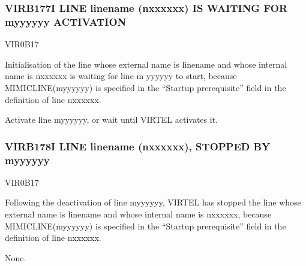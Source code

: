 \documentclass[letterpaper,10pt,english]{sphinxmanual}
\begin{document}
\subsubsection{VIRB177I LINE linename (n\sphinxhyphen{}xxxxxx) IS WAITING FOR m\sphinxhyphen{}yyyyyy ACTIVATION}
\label{\detokenize{messages:virb177i-line-linename-n-xxxxxx-is-waiting-for-m-yyyyyy-activation}}\begin{description}
\sphinxAtStartPar
VIR0B17

\sphinxAtStartPar
Initialisation of the line whose external name is linename and whose internal name is n\sphinxhyphen{}xxxxxx is waiting for line m\sphinxhyphen{} yyyyyy to start, because MIMIC\sphinxhyphen{}LINE(m\sphinxhyphen{}yyyyyy) is specified in the “Startup prerequisite” field in the definition of line n\sphinxhyphen{}xxxxxx.

\sphinxAtStartPar
Activate line m\sphinxhyphen{}yyyyyy, or wait until VIRTEL activates it.

\end{description}


\subsubsection{VIRB178I LINE linename (n\sphinxhyphen{}xxxxxx), STOPPED BY m\sphinxhyphen{}yyyyyy}
\label{\detokenize{messages:virb178i-line-linename-n-xxxxxx-stopped-by-m-yyyyyy}}\begin{description}
\sphinxAtStartPar
VIR0B17

\sphinxAtStartPar
Following the deactivation of line m\sphinxhyphen{}yyyyyy, VIRTEL has stopped the line whose external name is linename and whose internal name is n\sphinxhyphen{}xxxxxx, because MIMIC\sphinxhyphen{}LINE(m\sphinxhyphen{}yyyyyy) is specified in the “Startup prerequisite” field in the definition of line n\sphinxhyphen{}xxxxxx.

\sphinxAtStartPar
None.

\end{description}
\end{document}
